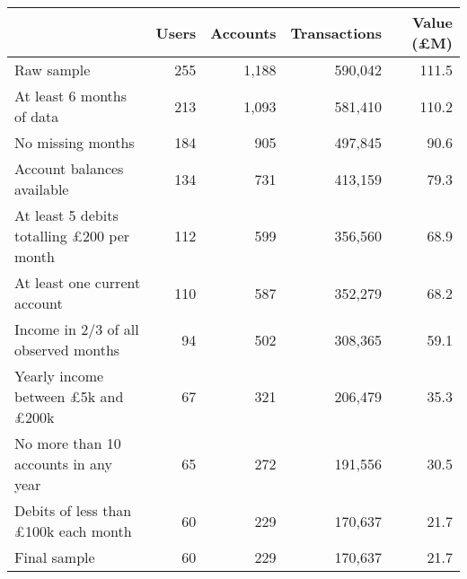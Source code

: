 \begin{tabular}{lrrrr}
\toprule
                                                 & Users & Accounts & Transactions & Value (\pounds M) \\
\midrule
                                      Raw sample &   255 &    1,188 &      590,042 &             111.5 \\
                       At least 6 months of data &   213 &    1,093 &      581,410 &             110.2 \\
                               No missing months &   184 &      905 &      497,845 &              90.6 \\
                      Account balances available &   134 &      731 &      413,159 &              79.3 \\
At least 5 debits totalling \pounds200 per month &   112 &      599 &      356,560 &              68.9 \\
                    At least one current account &   110 &      587 &      352,279 &              68.2 \\
            Income in 2/3 of all observed months &    94 &      502 &      308,365 &              59.1 \\
 Yearly income between \pounds5k and \pounds200k &    67 &      321 &      206,479 &              35.3 \\
            No more than 10 accounts in any year &    65 &      272 &      191,556 &              30.5 \\
      Debits of less than \pounds100k each month &    60 &      229 &      170,637 &              21.7 \\
                                    Final sample &    60 &      229 &      170,637 &              21.7 \\
\bottomrule
\end{tabular}
